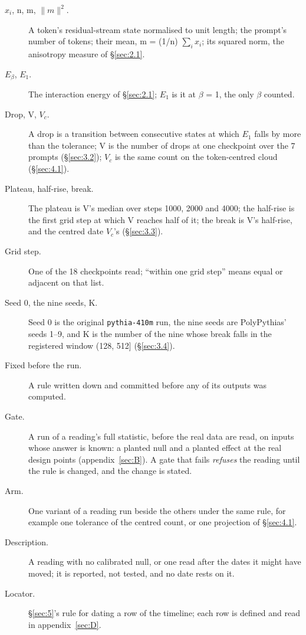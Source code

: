 \documentclass[11pt]{article}
\begin{document}
\begin{description}
  \item[$x_{i}$, n, m, $\|m\|^{2}$.] A token's residual-stream state normalised to unit length; the prompt's number of tokens; their mean, m = (1/n) $\sum _{i} x_{i}$; its squared norm, the anisotropy measure of \S\ref{sec:2.1}.
  \item[$E_\beta $, $E_{1}$.] The interaction energy of \S\ref{sec:2.1}; $E_{1}$ is it at $\beta $ = 1, the only $\beta $ counted.
  \item[Drop, V, $V_c$.] A drop is a transition between consecutive states at which $E_{1}$ falls by more than the tolerance; V is the number of drops at one checkpoint over the 7 prompts (\S\ref{sec:3.2}); $V_c$ is the same count on the token-centred cloud (\S\ref{sec:4.1}).
  \item[Plateau, half-rise, break.] The plateau is V's median over steps 1000, 2000 and 4000; the half-rise is the first grid step at which V reaches half of it; the break is V's half-rise, and the centred date $V_c$'s (\S\ref{sec:3.3}).
  \item[Grid step.] One of the 18 checkpoints read; ``within one grid step'' means equal or adjacent on that list.
  \item[Seed 0, the nine seeds, K.] Seed 0 is the original \texttt{pythia-410m} run, the nine seeds are PolyPythias' seeds 1--9, and K is the number of the nine whose break falls in the registered window (128, 512] (\S\ref{sec:3.4}).
  \item[Fixed before the run.] A rule written down and committed before any of its outputs was computed.
  \item[Gate.] A run of a reading's full statistic, before the real data are read, on inputs whose answer is known: a planted null and a planted effect at the real design points (appendix~\ref{sec:B}). A gate that fails \emph{refuses} the reading until the rule is changed, and the change is stated.
  \item[Arm.] One variant of a reading run beside the others under the same rule, for example one tolerance of the centred count, or one projection of \S\ref{sec:4.1}.
  \item[Description.] A reading with no calibrated null, or one read after the dates it might have moved; it is reported, not tested, and no date rests on it.
  \item[Locator.] \S\ref{sec:5}'s rule for dating a row of the timeline; each row is defined and read in appendix~\ref{sec:D}.
\end{description}
\end{document}
